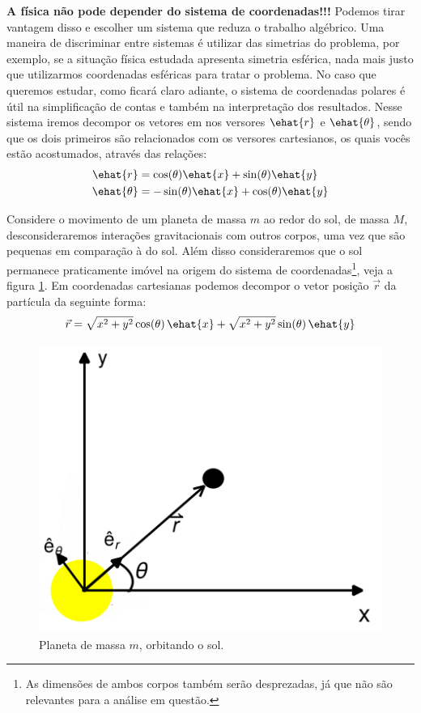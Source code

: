 \documentclass[]{IMTexam}
\begin{document}
\bigskip

\begin{questions}

	\question \label{ques:q1}
	\textbf{A física não pode depender do sistema de coordenadas!!!} Podemos tirar vantagem disso e escolher um sistema que reduza o trabalho algébrico. Uma maneira de discriminar entre sistemas é utilizar das simetrias do problema, por exemplo, se a situação física estudada apresenta simetria esférica, nada mais justo que utilizarmos coordenadas esféricas para tratar o problema. No caso que queremos estudar, como ficará claro adiante, o sistema de coordenadas polares é útil na simplificação de contas e também na interpretação dos resultados. Nesse sistema iremos decompor os vetores em nos versores $\ehat{r}$ e $\ehat{\theta}$, sendo que os dois primeiros são relacionados com os versores cartesianos, os quais vocês estão acostumados, através das relações:
	\begin{equation}\label{eq:eretdef}
		\begin{aligned}
			\ehat{r}      & = \cos (\theta)\ehat{x} + \sin (\theta)\ehat{y} \\
			\ehat{\theta} & = - \sin(\theta)\ehat{x} + \cos(\theta)\ehat{y}
		\end{aligned}
	\end{equation}

	Considere o movimento de um planeta de massa $ m $ ao redor do sol, de massa $ M $, desconsideraremos interações gravitacionais com outros corpos, uma vez que são pequenas em comparação à do sol. Além disso consideraremos que o sol permanece praticamente imóvel na origem do sistema de coordenadas\footnote{As dimensões de ambos corpos também serão desprezadas, já que não são relevantes para a análise em questão.}, veja a figura \ref{fig:PlanetOrbit}. Em coordenadas cartesianas podemos decompor o vetor posição $\vec{r}$ da partícula da seguinte forma:
	\begin{equation}\label{eq:rcartesian}
		\vec{r}=\sqrt{x^{2}+y^{2}}\cos(\theta)\,\ehat{x}+\sqrt{x^{2}+y^{2}}\sin(\theta)\,\ehat{y}
	\end{equation}

	\begin{figure}[H]
		\centering
		\includegraphics[width=0.4\linewidth]{screenshot002}
		\caption{Planeta de massa $ m $, orbitando o sol.}
		\label{fig:PlanetOrbit}
	\end{figure}


\end{questions}
\end{document}
